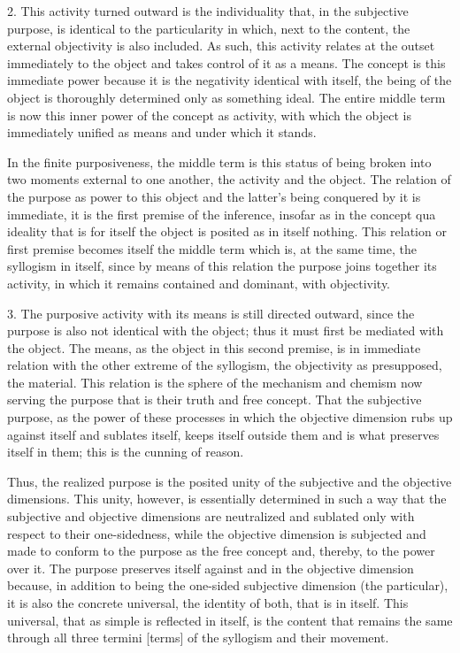 2. This activity turned outward is the individuality that,
in the subjective purpose, is identical to the particularity
in which, next to the content,
the external objectivity is also included.
As such, this activity relates at the outset
immediately to the object
and takes control of it as a means.
The concept is this immediate power
because it is the negativity identical with itself,
the being of the object is thoroughly
determined only as something ideal.
The entire middle term is now this
inner power of the concept as activity,
with which the object is immediately unified
as means and under which it stands.

In the finite purposiveness, the middle term is this status of
being broken into two moments external to one another,
the activity and the object.
The relation of the purpose as power to this object
and the latter's being conquered by it is immediate,
it is the first premise of the inference,
insofar as in the concept qua ideality that is for itself
the object is posited as in itself nothing.
This relation or first premise becomes itself the middle term
which is, at the same time, the syllogism in itself,
since by means of this relation the purpose joins together its activity,
in which it remains contained and dominant, with objectivity.

3. The purposive activity with its means is still directed outward,
since the purpose is also not identical with the object;
thus it must first be mediated with the object.
The means, as the object in this second premise,
is in immediate relation with the other extreme of the syllogism,
the objectivity as presupposed, the material.
This relation is the sphere of the mechanism and chemism
now serving the purpose that is their truth and free concept.
That the subjective purpose, as the power of these processes
in which the objective dimension rubs up against itself and sublates itself,
keeps itself outside them and is what preserves itself in them;
this is the cunning of reason.

Thus, the realized purpose is the posited unity of
the subjective and the objective dimensions.
This unity, however, is essentially determined in such a way that
the subjective and objective dimensions are neutralized
and sublated only with respect to their one-sidedness,
while the objective dimension is subjected
and made to conform to the purpose as the free concept
and, thereby, to the power over it.
The purpose preserves itself
against and in the objective dimension
because, in addition to being
the one-sided subjective dimension (the particular),
it is also the concrete universal,
the identity of both, that is in itself.
This universal, that as simple is reflected in itself,
is the content that remains the same
through all three termini [terms] of
the syllogism and their movement.

